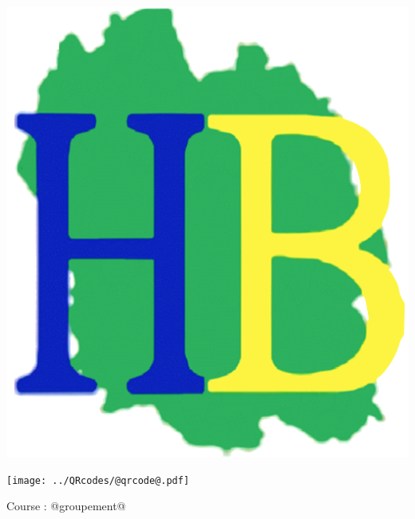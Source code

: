 \Huge

\begin{block} %
{}\hfill {}
{}\hfill {}
\begin{minipage}{0.15\linewidth}
\includegraphics[width=\textwidth]{../media/logo-HB.png}
\end{minipage}
{}\hfill {}



\begin{minipage}{0.48\linewidth}
\texttt{[image: ../QRcodes/@qrcode@.pdf]}

\vspace{0.5cm}

Course : @groupement@
\end{minipage}
\begin{minipage}{0.5\linewidth}
{}\hfill {}
{}\hfill {}


\end{minipage}
\end{block}
